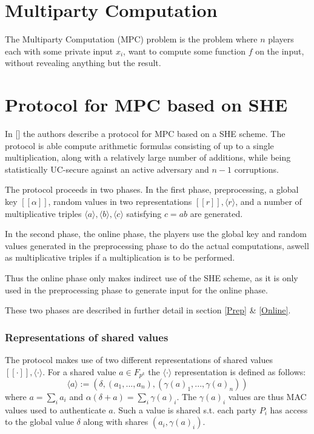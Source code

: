 \documentclass{article}
\begin{document}
\section{Multiparty Computation}
The Multiparty Computation (MPC) problem is the problem where $n$ players each with some private input $x_i$, want to compute some function $f$ on the input, without revealing anything but the result.
\section{Protocol for MPC based on SHE}
In [] the authors describe a protocol for MPC based on a SHE scheme. The protocol is able compute arithmetic formulas consisting of up to a single multiplication, along with a relatively large number of additions, while being statistically UC-secure against an active adversary and $n - 1$ corruptions.

The protocol proceeds in two phases. In the first phase, preprocessing, a global key $[\![\alpha]\!]$, random values in two representations $[\![r]\!], \langle r \rangle$, and a number of multiplicative triples $\langle a \rangle, \langle b \rangle, \langle c \rangle$ satisfying $c = ab$ are generated. 

In the second phase, the online phase, the players use the global key and random values generated in the preprocessing phase to do the actual computations, aswell as multiplicative triples if a multiplication is to be performed.

Thus the online phase only makes indirect use of the SHE scheme, as it is only used in the preprocessing phase to generate input for the online phase.

These two phases are described in further detail in section \ref{Prep} \& \ref{Online}.

\subsubsection{Representations of shared values}
The protocol makes use of two different representations of shared values $[\![ \cdot ]\!], \langle \cdot \rangle$. For a shared value $a \in F_{p^k}$ the $\langle \cdot \rangle$ representation is defined as follows:
$$\langle a \rangle := (\delta, (a_1, ..., a_n), (\gamma(a)_1, ..., \gamma(a)_n))$$
where $a = \sum_i a_i$ and $\alpha (\delta + a) = \sum_i \gamma(a)_i$. The $\gamma(a)_i$ values are thus MAC values used to authenticate $a$. Such a value is shared s.t. each party $P_i$ has access to the global value $\delta$ along with shares $(a_i, \gamma(a)_i)$.
\end{document}
